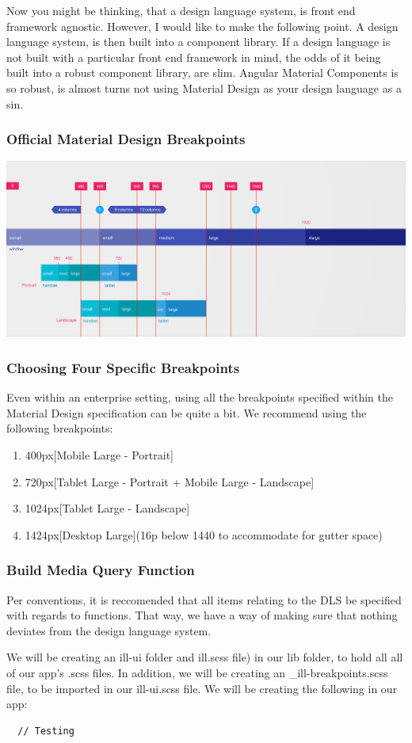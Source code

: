 Now you might be thinking, that a design language system, is front end framework
agnostic. However, I would like to make the following point. A design language
system, is then built into a component library. If a design language is not
built with a particular front end framework in mind, the odds of it being
built into a robust component library, are slim. Angular Material Components is
so robust, is almost turns not using Material Design as your design language as
a sin.

\subsubsection{ Official Material Design Breakpoints }
\includegraphics[scale=0.15]{responsive/layout-adaptive-breakpoints}

\subsubsection{ Choosing Four Specific Breakpoints }
Even within an enterprise setting, using all the breakpoints specified within
the Material Design specification can be quite a bit. We recommend using the
following breakpoints:

\begin{enumerate}
  \item 400px[Mobile Large - Portrait]
  \item 720px[Tablet Large - Portrait + Mobile Large - Landscape]
  \item 1024px[Tablet Large - Landscape]
  \item 1424px[Desktop Large](16p below 1440 to accommodate for gutter space)
\end{enumerate}

\subsubsection{ Build Media Query Function }
Per conventions, it is reccomended that all items relating to the DLS be
specified with regards to functions. That way, we have a way of making sure
that nothing deviates from the design language system.

We will be creating an ill-ui folder and ill.scss file) in our lib folder, to
hold all all of our app's .scss files. In addition, we will be creating an
 \_ill-breakpoints.scss file, to be imported in our ill-ui.scss file. We will be
creating the following in our app:

\begin{verbatim}
  // Testing
\end{verbatim}
